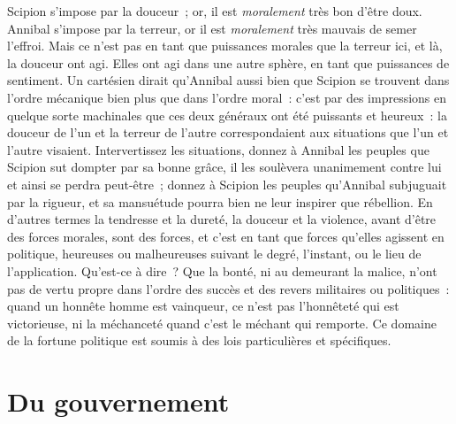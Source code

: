 \documentclass[french,twoside]{book} %
\begin{document}
\noindent Scipion s’impose par la douceur ; or, il est \emph{moralement} très bon d’être doux. Annibal s’impose par la terreur, or il est \emph{moralement} très mauvais de semer l’effroi. Mais ce n’est pas en tant que puissances morales que la terreur ici, et là, la douceur ont agi. Elles ont agi dans une autre sphère, en tant que puissances de sentiment. Un cartésien dirait qu’Annibal aussi bien que Scipion se trouvent dans l’ordre mécanique bien plus que dans l’ordre moral : c’est par des impressions en quelque sorte machinales que ces deux généraux ont été puissants et heureux : la douceur de l’un et la terreur de l’autre correspondaient aux situations que l’un et l’autre visaient. Intervertissez les situations, donnez à Annibal les peuples que Scipion sut dompter par sa bonne grâce, il les soulèvera unanimement contre lui et ainsi se perdra peut-être ; donnez à Scipion les peuples qu’Annibal subjuguait par la rigueur, et sa mansuétude pourra bien ne leur inspirer que rébellion. En d’autres termes la tendresse et la dureté, la douceur et la violence, avant d’être des forces morales, sont des forces, et c’est en tant que forces qu’elles agissent en politique, heureuses ou malheureuses suivant le degré, l’instant, ou le lieu de l’application. Qu’est-ce à dire ? Que la bonté, ni au demeurant la malice, n’ont pas de vertu propre dans l’ordre des succès et des revers militaires ou politiques : quand un honnête homme est vainqueur, ce n’est pas l’honnêteté qui est victorieuse, ni la méchanceté quand c’est le méchant qui remporte. Ce domaine de la fortune politique est soumis à des lois particulières et spécifiques.
\section[Du gouvernement]{Du gouvernement}
\end{document}
